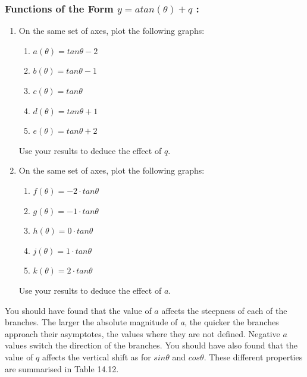             \subsubsection{  Functions of the Form $y=atan\left(\theta \right)+q$ :}
            \nopagebreak
        \label{m39414*id90310}\begin{enumerate}[noitemsep, label=\textbf{\arabic*}. ] 
            \label{m39414*uid74}\item On the same set of axes, plot the following graphs:
\label{m39414*id90326}\begin{enumerate}[noitemsep, label=\textbf{\alph*}. ] 
            \label{m39414*uid75}\item $a\left(\theta \right)=tan\theta -2$\label{m39414*uid76}\item $b\left(\theta \right)=tan\theta -1$\label{m39414*uid77}\item $c\left(\theta \right)=tan\theta $\label{m39414*uid78}\item $d\left(\theta \right)=tan\theta +1$\label{m39414*uid79}\item $e\left(\theta \right)=tan\theta +2$\end{enumerate}
Use your results to deduce the effect of $q$.
\label{m39414*uid80}\item On the same set of axes, plot the following graphs:
\label{m39414*id90547}\begin{enumerate}[noitemsep, label=\textbf{\alph*}. ] 
            \label{m39414*uid81}\item $f\left(\theta \right)=-2\ensuremath{\cdot}tan\theta $\label{m39414*uid82}\item $g\left(\theta \right)=-1\ensuremath{\cdot}tan\theta $\label{m39414*uid83}\item $h\left(\theta \right)=0\ensuremath{\cdot}tan\theta $\label{m39414*uid84}\item $j\left(\theta \right)=1\ensuremath{\cdot}tan\theta $\label{m39414*uid85}\item $k\left(\theta \right)=2\ensuremath{\cdot}tan\theta $\end{enumerate}
Use your results to deduce the effect of $a$.
\end{enumerate}
        \label{m39414*id90781}You should have found that the value of $a$ affects the steepness of each of the branches. The larger the absolute magnitude of \textsl{a}, the quicker the branches approach their asymptotes, the values where they are not defined. Negative $\mathit{a}$ values switch the direction of the branches.
You should have also found that the value of $q$ affects the vertical shift as for $sin\theta $ and $cos\theta $.
These different properties are summarised in Table 14.12.\par 
